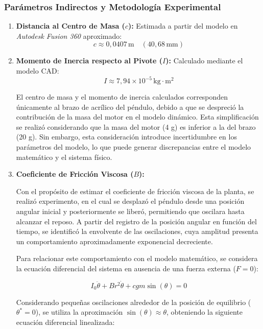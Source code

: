 \subsubsection{Parámetros Indirectos y Metodología Experimental}
\begin{enumerate}
  \item \textbf{Distancia al Centro de Masa ($c$):} 
  Estimada a partir del modelo en \textit{Autodesk Fusion 360} aproximado:
  \begin{equation}
    c \approx 0{,}0407\,\mathrm{m} \quad (40{,}68\,\mathrm{mm})
  \end{equation}

  \item \textbf{Momento de Inercia respecto al Pivote ($I$):} 
  Calculado mediante el modelo CAD:
  \begin{equation}
    I \approx 7{,}94 \times 10^{-5}\,\mathrm{kg\cdot m^2}
  \end{equation}
  
  El centro de masa y el momento de inercia calculados corresponden únicamente al brazo de acrílico del péndulo, debido a que se despreció la contribución de la masa del motor en el modelo dinámico. Esta simplificación se realizó considerando que la masa del motor (4 g) es inferior a la del brazo (20 g). Sin embargo, esta consideración introduce incertidumbre en los parámetros del modelo, lo que puede generar discrepancias entre el modelo matemático y el sistema físico.

 \item \textbf{Coeficiente de Fricción Viscosa ($B$):} 

 Con el propósito de estimar el coeficiente de fricción viscosa de la planta, se realizó experimento, en el cual se desplazó el péndulo desde una posición angular inicial y posteriormente se liberó, permitiendo que oscilara hasta alcanzar el reposo. A partir del registro de la posición angular en función del tiempo, se identificó la envolvente de las oscilaciones, cuya amplitud presenta un comportamiento aproximadamente exponencial decreciente.

Para relacionar este comportamiento con el modelo matemático, se considera la ecuación diferencial del sistema en ausencia de una fuerza externa (\(F=0\)):

\[
I_0\ddot{\theta}+Br^2\dot{\theta}
+cgm\sin(\theta)=0
\]

Considerando pequeñas oscilaciones alrededor de la posición de equilibrio (\(\theta^*=0\)), se utiliza la aproximación \(\sin(\theta)\approx\theta\), obteniendo la siguiente ecuación diferencial linealizada:


\end{enumerate}
